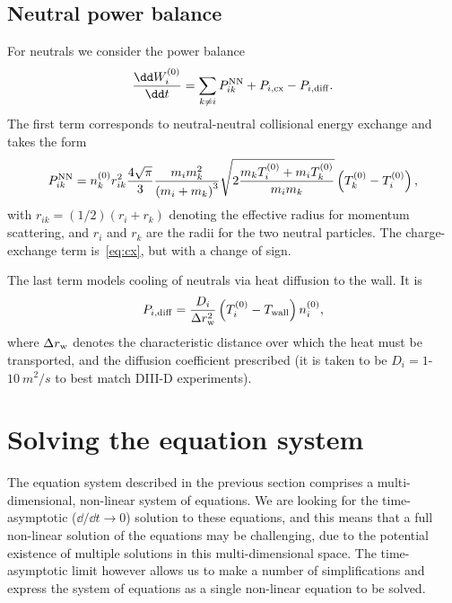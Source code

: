 \documentclass{notes}
\begin{document}
	\subsection{Neutral power balance}
	For neutrals we consider the power balance
	\begin{equation}
		\frac{\dd W_i^{(0)}}{\dd t} =
			\sum_{k\neq i} P_{ik}^{\rm NN} + P_{i,{\rm cx}} - P_{i,\rm diff}.
	\end{equation}
	The first term corresponds to neutral-neutral collisional energy exchange
	and takes the form
	\begin{equation}
		P_{ik}^{\rm NN} =
			n_k^{(0)} r_{ik}^2
			\frac{4\sqrt{\pi}}{3}
			\frac{m_im_k^2}{\left(m_i+m_k\right)^3}
			\sqrt{2\frac{m_kT_i^{(0)} + m_iT_k^{(0)}}{m_im_k}}
			\left(T_k^{(0)}-T_i^{(0)}\right),
	\end{equation}
	with $r_{ik}=(1/2)(r_i+r_k)$ denoting the effective radius for momentum
	scattering, and $r_i$ and $r_k$ are the radii for the two neutral particles.
	The charge-exchange term is~\eqref{eq:cx}, but with a change of sign.

	The last term models cooling of neutrals via heat diffusion to the wall. It
	is
	\begin{equation}
		P_{i,\rm diff} = \frac{D_i}{\Delta r_{\rm w}^2}\left(T_i^{(0)}-T_{\rm wall}\right) n_i^{(0)},
	\end{equation}
	where $\Delta r_{\rm w}$ denotes the characteristic distance over which the
	heat must be transported, and the diffusion coefficient prescribed (it is
	taken to be $D_i=1$-$\SI{10}{m^2/s}$ to best match DIII-D experiments).

	\section{Solving the equation system}\label{sec:solution}
	The equation system described in the previous section comprises a
	multi-dimensional, non-linear system of equations. We are looking for the
	time-asymptotic ($\dd/\dd t\to 0$) solution to these equations, and this
	means that a full non-linear solution of the equations may be challenging,
	due to the potential existence of multiple solutions in this
	multi-dimensional space. The time-asymptotic limit however allows us to make
	a number of simplifications and express the system of equations as a single
	non-linear equation to be solved.
\end{document}

